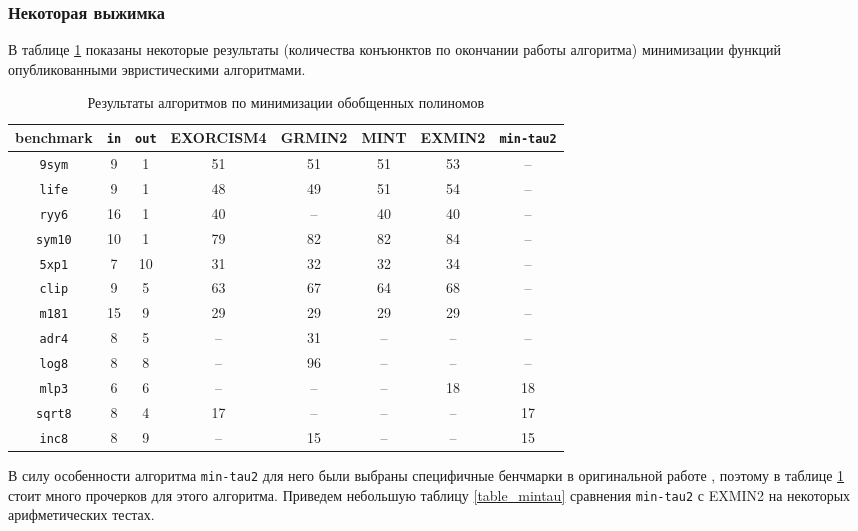 \documentclass[a4paper,12pt,titlepage,finall]{article}
\begin{document}
\subsubsection*{Некоторая выжимка}

В таблице \ref{table_benchmark} показаны некоторые результаты (количества конъюнктов по окончании работы алгоритма) минимизации функций опубликованными эвристическими алгоритмами.

\begin{table}[h!]
\centering
\begin{tabular}{ |c||c|c||c|c|c|c|c| }
\hline
\textbf{benchmark} & \texttt{\bf in} & \texttt{\bf out} & \textsc{EXORCISM4} & \textsc{GRMIN2} & \textsc{MINT} & \textsc{EXMIN2} & \texttt{min-tau2} \\
\hline\hline
\texttt{9sym}   & 9  & 1  & 51 & 51 & 51 & 53 & – \\
\hline
\texttt{life}   & 9  & 1  & 48 & 49 & 51 & 54 & – \\
\hline
\texttt{ryy6}   & 16 & 1  & 40 & –  & 40 & 40 & – \\
\hline
\texttt{sym10}  & 10 & 1  & 79 & 82 & 82 & 84 & – \\
\hline\hline
\texttt{5xp1}   & 7  & 10 & 31 & 32 & 32 & 34 & – \\
\hline
\texttt{clip}   & 9  & 5  & 63 & 67 & 64 & 68 & – \\
\hline
\texttt{m181}   & 15 & 9  & 29 & 29 & 29 & 29 & – \\
\hline\hline
\texttt{adr4}   & 8  & 5  & –  & 31 & –  & –  & – \\
\hline
\texttt{log8}   & 8  & 8  & –  & 96 & –  & –  & – \\
\hline
\texttt{mlp3}   & 6  & 6  & –  & –  & –  & 18 & 18 \\
\hline
\texttt{sqrt8}  & 8  & 4  & 17 & –  & –  & –  & 17 \\
\hline
\texttt{inc8}   & 8  & 9  & –  & 15 & –  & –  & 15 \\
\hline
\end{tabular}
\caption{Результаты алгоритмов по минимизации обобщенных полиномов}
\label{table_benchmark}
\end{table}

В силу особенности алгоритма \texttt{min-tau2} для него были выбраны специфичные бенчмарки в оригинальной работе \cite{min-tau2}, поэтому в таблице \ref{table_benchmark} стоит много прочерков для этого алгоритма. Приведем небольшую таблицу \ref{table_mintau} сравнения \texttt{min-tau2} с \textsc{EXMIN2} на некоторых арифметических тестах.
\end{document}
